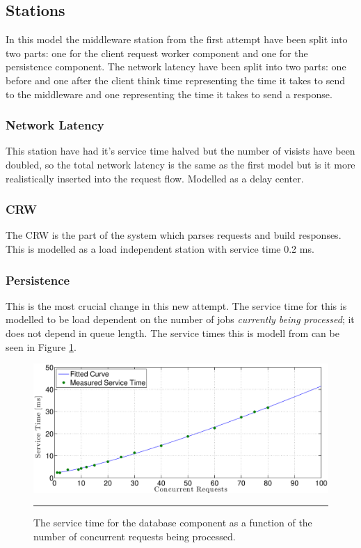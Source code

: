 \documentclass[a4paper, 11pt]{article}
\begin{document}
\subsection{Stations}

	In this model the middleware station from the first attempt have been split into two parts: one for the client request worker component and one for the persistence component. The network latency have been split into two parts: one before and one after the client think time representing the time it takes to send to the middleware and one representing the time it takes to send a response.

	\subsubsection{Network Latency}
		This station have had it's service time halved but the number of visists have been doubled, so the total network latency is the same as the first model but is it more realistically inserted into the request flow. Modelled as a delay center.

	\subsubsection{CRW}
		The CRW is the part of the system which parses requests and build responses. This is modelled as a load independent station with service time 0.2 ms.

	\subsubsection{Persistence}
		This is the most crucial change in this new attempt. The service time for this is modelled to be load dependent on the number of jobs \textit{currently being processed}; it does not depend in queue length. The service times this is modell from can be seen in Figure \ref{fig:db-service-time}.

		\begin{figure}[cht!]
			\centering
				\includegraphics[width=\linewidth]{dbServiceTime}
				\rule{35em}{0.5pt}
			\caption{The service time for the database component as a function of the number of concurrent requests being processed.}
			\label{fig:db-service-time}
		\end{figure}
		\FloatBarrier
	
\end{document}
